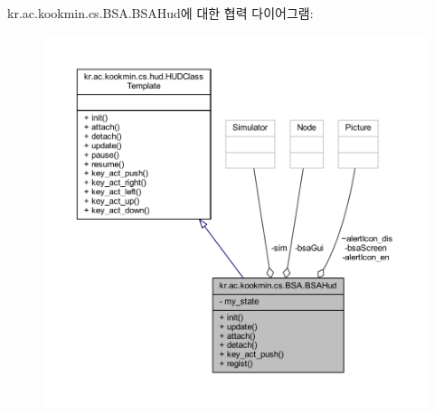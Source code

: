 kr.\+ac.\+kookmin.\+cs.\+B\+S\+A.\+B\+S\+A\+Hud에 대한 협력 다이어그램\+:\nopagebreak
\begin{figure}[H]
\begin{center}
\leavevmode
\includegraphics[width=350pt]{classkr_1_1ac_1_1kookmin_1_1cs_1_1_b_s_a_1_1_b_s_a_hud__coll__graph}
\end{center}
\end{figure}
